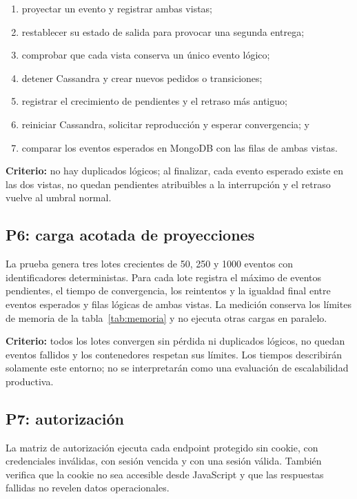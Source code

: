 \begin{enumerate}
  \item proyectar un evento y registrar ambas vistas;
  \item restablecer su estado de salida para provocar una segunda entrega;
  \item comprobar que cada vista conserva un único evento lógico;
  \item detener Cassandra y crear nuevos pedidos o transiciones;
  \item registrar el crecimiento de pendientes y el retraso más antiguo;
  \item reiniciar Cassandra, solicitar reproducción y esperar convergencia; y
  \item comparar los eventos esperados en MongoDB con las filas de ambas vistas.
\end{enumerate}

\textbf{Criterio:} no hay duplicados lógicos; al finalizar, cada evento esperado existe en las dos vistas, no quedan pendientes atribuibles a la interrupción y el retraso vuelve al umbral normal.

\subsection{P6: carga acotada de proyecciones}

La prueba  genera tres lotes crecientes de 50, 250 y 1000 eventos con identificadores deterministas. Para cada lote registra el máximo de eventos pendientes, el tiempo de convergencia, los reintentos y la igualdad final entre eventos esperados y filas lógicas de ambas vistas. La medición conserva los límites de memoria de la tabla~\ref{tab:memoria} y no ejecuta otras cargas en paralelo.

\textbf{Criterio:} todos los lotes convergen sin pérdida ni duplicados lógicos, no quedan eventos fallidos y los contenedores respetan sus límites. Los tiempos describirán solamente este entorno; no se interpretarán como una evaluación de escalabilidad productiva.

\subsection{P7: autorización}

La matriz de autorización ejecuta cada endpoint protegido sin cookie, con credenciales inválidas, con sesión vencida y con una sesión válida. También verifica que la cookie no sea accesible desde JavaScript y que las respuestas fallidas no revelen datos operacionales.

